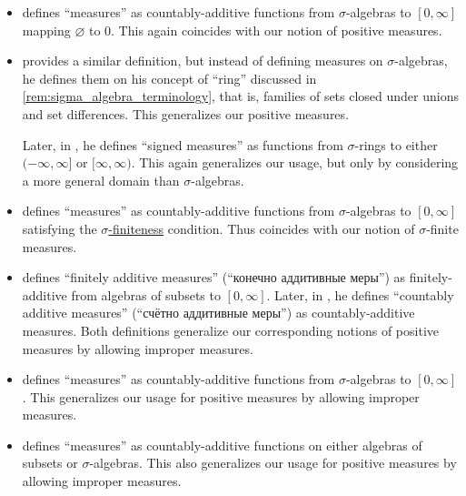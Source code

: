 \begin{remark}
\begin{itemize}
    \item {} defines \enquote{measures} as countably-additive functions from \( \sigma \)-algebras to \( [0, \infty] \) mapping \( \varnothing \) to \( 0 \). This again coincides with our notion of positive measures.

    \item {} provides a similar definition, but instead of defining measures on \( \sigma \)-algebras, he defines them on his concept of \enquote{ring} discussed in \cref{rem:sigma_algebra_terminology}, that is, families of sets closed under unions and set differences. This generalizes our positive measures.

    Later, in , he defines \enquote{signed measures} as functions from \( \sigma \)-rings to either \( (-\infty, \infty] \) or \( [\infty, \infty) \). This again generalizes our usage, but only by considering a more general domain than \( \sigma \)-algebras.

    \item {} defines \enquote{measures} as countably-additive functions from \( \sigma \)-algebras to \( [0, \infty] \) satisfying the \hyperref[def:sigma_finite_measure]{\( \sigma \)-finiteness} condition. Thus coincides with our notion of \( \sigma \)-finite measures.

    \item {} defines \enquote{finitely additive measures} (\enquote{конечно аддитивные меры}) as finitely-additive from algebras of subsets to \( [0, \infty] \). Later, in \cite[def. I.1.6]{Ширяев2007ВероятностьТом1}, he defines \enquote{countably additive measures} (\enquote{счётно аддитивные меры}) as countably-additive measures. Both definitions generalize our corresponding notions of positive measures by allowing improper measures.

    \item {} defines \enquote{measures} as countably-additive functions from \( \sigma \)-algebras to \( [0, \infty] \). This generalizes our usage for positive measures by allowing improper measures.

    \item {} defines \enquote{measures} as countably-additive functions on either algebras of subsets or \( \sigma \)-algebras. This also generalizes our usage for positive measures by allowing improper measures.


\end{itemize}
\end{remark}
